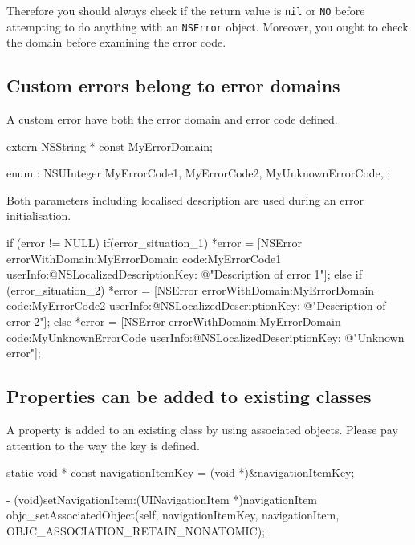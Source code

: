\documentclass[10pt]{extarticle}
\newcommand{\inlinecode}[1]{{\textcolor{TundoraColor}{\texttt{#1}}}}
\begin{document}
Therefore you should always check if the return value is \inlinecode{nil} or \inlinecode{NO} before attempting to do anything with an \inlinecode{NSError} object. Moreover, you ought to check the domain before examining the error code.


\subsection{Custom errors belong to error domains}

A custom error have both the error domain and error code defined.

\begin{codelisting}
extern NSString * const MyErrorDomain;

enum : NSUInteger
{
    MyErrorCode1,
    MyErrorCode2,
    MyUnknownErrorCode,
};
\end{codelisting}

Both parameters including localised description are used during an error initialisation.

\begin{codelisting}
if (error != NULL) {
    if(error_situation_1) {
        *error = [NSError errorWithDomain:MyErrorDomain 
                                     code:MyErrorCode1
                                 userInfo:@{NSLocalizedDescriptionKey: @"Description of error 1"}];
    }
    else if (error_situation_2) {
        *error = [NSError errorWithDomain:MyErrorDomain 
                                     code:MyErrorCode2
                                 userInfo:@{NSLocalizedDescriptionKey: @"Description of error 2"}];
    }
    else {
        *error = [NSError errorWithDomain:MyErrorDomain 
                                     code:MyUnknownErrorCode
                                 userInfo:@{NSLocalizedDescriptionKey: @"Unknown error"}];
    }
}
\end{codelisting}


\subsection{Properties can be added to existing classes}

A property is added to an existing class by using associated objects. Please pay attention to the way the key is defined.

\begin{codelisting}
static void * const navigationItemKey = (void *)&navigationItemKey;

- (void)setNavigationItem:(UINavigationItem *)navigationItem
{
    objc_setAssociatedObject(self, 
                             navigationItemKey, 
                             navigationItem, 
                             OBJC_ASSOCIATION_RETAIN_NONATOMIC);
}
\end{codelisting}
\end{document}
